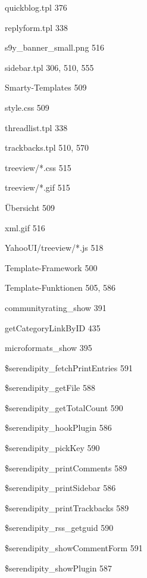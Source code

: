 \documentclass{book}
\renewcommand\subitem{\par}
\begin{document}
\begin{multicols}{2}
\begin{osp-index}
    \subitem quickblog.tpl\hspace{1mm} 376
    \subitem replyform.tpl\hspace{1mm} 338
    \subitem s9y\_banner\_small.png\hspace{1mm} 516
    \subitem sidebar.tpl\hspace{1mm} 306, 510, 555
    \subitem Smarty-Templates\hspace{1mm} 509
    \subitem style.css\hspace{1mm} 509
    \subitem threadlist.tpl\hspace{1mm} 338
    \subitem trackbacks.tpl\hspace{1mm} 510, 570
    \subitem treeview/*.css\hspace{1mm} 515
    \subitem treeview/*.gif\hspace{1mm} 515
    \subitem \"Ubersicht\hspace{1mm} 509
    \subitem xml.gif\hspace{1mm} 516
    \subitem YahooUI/treeview/*.js\hspace{1mm} 518
  \item Template-Framework\hspace{1mm} 500
  \item Template-Funktionen\hspace{1mm} 505, 586
    \subitem communityrating\_show\hspace{1mm} 391
    \subitem getCategoryLinkByID\hspace{1mm} 435
    \subitem microformats\_show\hspace{1mm} 395
    \subitem \$serendipity\_fetchPrintEntries\hspace{1mm} 591
    \subitem \$serendipity\_getFile\hspace{1mm} 588
    \subitem \$serendipity\_getTotalCount\hspace{1mm} 590
    \subitem \$serendipity\_hookPlugin\hspace{1mm} 586
    \subitem \$serendipity\_pickKey\hspace{1mm} 590
    \subitem \$serendipity\_printComments\hspace{1mm} 589
    \subitem \$serendipity\_printSidebar\hspace{1mm} 586
    \subitem \$serendipity\_printTrackbacks\hspace{1mm} 589
    \subitem \$serendipity\_rss\_getguid\hspace{1mm} 590
    \subitem \$serendipity\_showCommentForm\hspace{1mm} 591
    \subitem \$serendipity\_showPlugin\hspace{1mm} 587

\end{osp-index}
\end{multicols}
\end{document}
